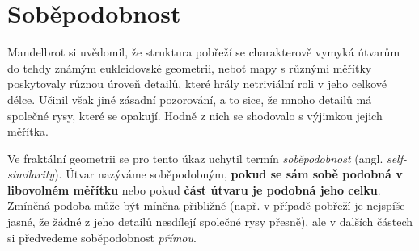 \section{Soběpodobnost}\label{sec:sobepodobnost}
Mandelbrot si uvědomil, že struktura pobřeží se charakterově vymyká útvarům do tehdy známým eukleidovské geometrii, neboť mapy s různými měřítky poskytovaly různou úroveň detailů, které hrály netriviální roli v jeho celkové délce. Učinil však jiné zásadní pozorování, a to sice, že mnoho detailů má společné rysy, které se opakují. Hodně z nich se shodovalo s výjimkou jejich měřítka. \citep[str. 96]{Mandelbrot1983}\par

Ve fraktální geometrii se pro tento úkaz uchytil termín \emph{soběpodobnost} (angl. \emph{self-similarity}). Útvar nazýváme soběpodobným, \textbf{pokud se sám sobě podobná v libovolném měřítku} \citep[str. 220]{Voracova2022} nebo pokud \textbf{část útvaru je podobná jeho celku}. Zmíněná podoba může být míněna přibližně (např. v případě pobřeží je nejspíše jasné, že žádné z jeho detailů nesdílejí společné rysy přesně), ale v dalších částech si předvedeme soběpodobnost \emph{přímou}.

